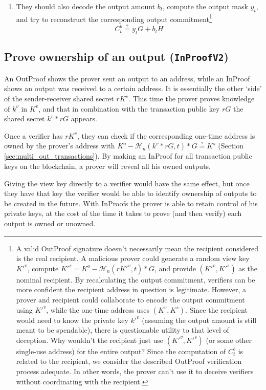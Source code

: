 \begin{enumerate}
    \item They should also decode the output amount $b_t$, compute the output mask $y_t$, and try to reconstruct the corresponding output commitment\footnote{A valid OutProof signature doesn't necessarily mean the recipient considered is the real recipient. A malicious prover could generate a random view key $K'^v$, compute $K'^s = K^o - \mathcal{H}_n(rK'^v,t)*G$, and provide $(K'^v,K'^s)$ as the nominal recipient. By recalculating the output commitment, verifiers can be more confident the recipient address in question is legitimate. However, a prover and recipient could collaborate to encode the output commitment using $K'^v$, while the one-time address uses $(K^v,K^s)$. Since the recipient would need to know the private key $k'^v$ (assuming the output amount is still meant to be spendable), there is questionable utility to that level of deception. Why wouldn't the recipient just use $(K'^v,K'^s)$ (or some other single-use address) for the entire output? Since the computation of $C^b_t$ is related to the recipient, we consider the described OutProof verification process adequate. In other words, the prover can't use it to deceive verifiers without coordinating with the recipient.}\vspace{.175cm}
    \[C^b_t \stackrel{?}{=} y_t G + b_t H\]
\end{enumerate}{}


\subsection{Prove ownership of an output ({\tt InProofV2})}
\label{subsec:proofs-output-ownership-inproof}

An OutProof shows the prover sent an output to an address, while an InProof shows an output was received to a certain address. It is essentially the other `side' of the sender-receiver shared secret $r K^v$. This time the prover proves knowledge of $k^v$ in $K^v$, and that in combination with the transaction public key $r G$ the shared secret $k^v*r G$ appears.

Once a verifier has $r K^v$, they can check if the corresponding one-time address is owned by the prover's address with $K^o - \mathcal{H}_n(k^v*rG,t)*G \stackrel{?}{=} K^s$ (Section \ref{sec:multi_out_transactions}). By making an InProof for all transaction public keys on the blockchain, a prover will reveal all his owned outputs.

Giving the view key directly to a verifier would have the same effect, but once they have that key the verifier would be able to identify ownership of outputs to be created in the future. With InProofs the prover is able to retain control of his private keys, at the cost of the time it takes to prove (and then verify) each output is owned or unowned.

